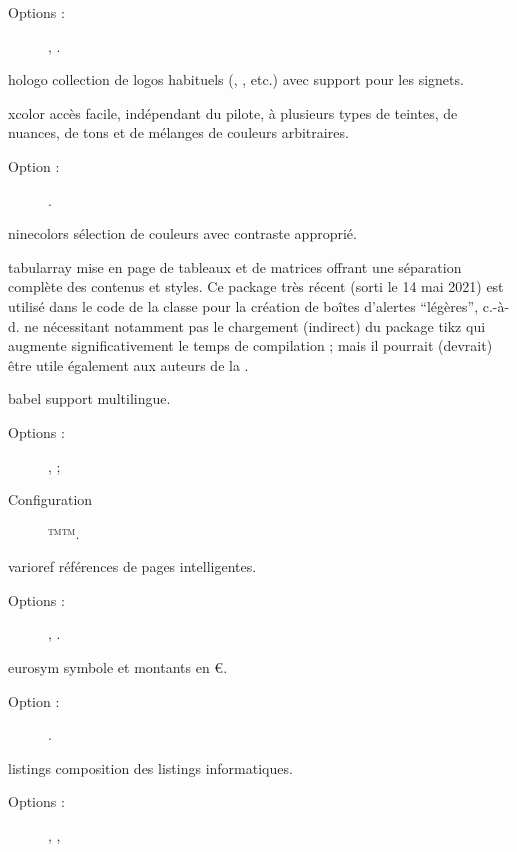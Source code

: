 \documentclass{letgut}
\begin{document}
\begin{ctannews}
\begin{description}
  \item[Options :] , .
  \end{description}
\item[hologo] collection de logos habituels (, ,
  etc.) avec support pour les signets.
\item[xcolor] accès facile, indépendant du pilote, à plusieurs types de teintes,
  de nuances, de tons et de mélanges de couleurs arbitraires.
  \begin{description}
  \item[Option :] .
  \end{description}
\item[ninecolors] sélection de couleurs avec contraste \wcag{} approprié.
\item[tabularray] mise en page de tableaux et de matrices offrant une séparation
  complète des contenus et styles. Ce package très récent (sorti le 14 mai 2021)
  est utilisé dans le code de la classe pour la création de boîtes d'alertes
  \enquote{légères}, c.-à-d. ne nécessitant notamment pas le chargement
  (indirect) du package \ac{tikz} qui augmente significativement le temps de
  compilation ; mais il pourrait (devrait) être utile également aux auteurs de
  la .
\item[babel] support multilingue.
  \begin{description}
  \item[Options :] ,  ;
  \item[Configuration] ™\renewcommand*\frenchtablename{Tableau}™.
  \end{description}
\item[varioref] références de pages intelligentes.
  \begin{description}
  \item[Options :] , .
  \end{description}
\item[eurosym] symbole et montants en \euro{}.
  \begin{description}
  \item[Option :] .
  \end{description}
\item[listings] composition des listings informatiques.
  \begin{description}
  \item[Options :] , ,

\end{description}
\end{ctannews}
\end{document}

